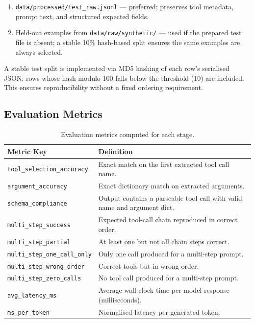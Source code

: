 \documentclass[12pt, a4paper]{article}
\newcommand{\thead}[1]{\textbf{#1}}
\begin{document}
\begin{enumerate}[leftmargin=1.5em, itemsep=3pt]
  \item \texttt{data/processed/test\_raw.jsonl} --- preferred; preserves tool
    metadata, prompt text, and structured expected fields.
  \item Held-out examples from \texttt{data/raw/synthetic/} --- used if the
    prepared test file is absent; a stable 10\% hash-based split ensures the
    same examples are always selected.
\end{enumerate}

A stable test split is implemented via MD5 hashing of each row's serialised
JSON; rows whose hash modulo 100 falls below the threshold (10) are included.
This ensures reproducibility without a fixed ordering requirement.

\subsection{Evaluation Metrics}

\begin{table}[H]
\centering
\caption{Evaluation metrics computed for each stage.}
\begin{tabularx}{\linewidth}{L{5cm} L{9.2cm}}
\toprule
\thead{Metric Key} & \thead{Definition} \\
\midrule
\texttt{tool\_selection\_accuracy} & Exact match on the first extracted tool call name. \\
\texttt{argument\_accuracy} & Exact dictionary match on extracted arguments. \\
\texttt{schema\_compliance} & Output contains a parseable tool call with valid name and argument dict. \\
\texttt{multi\_step\_success} & Expected tool-call chain reproduced in correct order. \\
\texttt{multi\_step\_partial} & At least one but not all chain steps correct. \\
\texttt{multi\_step\_one\_call\_only} & Only one call produced for a multi-step prompt. \\
\texttt{multi\_step\_wrong\_order} & Correct tools but in wrong order. \\
\texttt{multi\_step\_zero\_calls} & No tool call produced for a multi-step prompt. \\
\texttt{avg\_latency\_ms} & Average wall-clock time per model response (milliseconds). \\
\texttt{ms\_per\_token} & Normalised latency per generated token. \\
\bottomrule
\end{tabularx}
\end{table}
\end{document}
